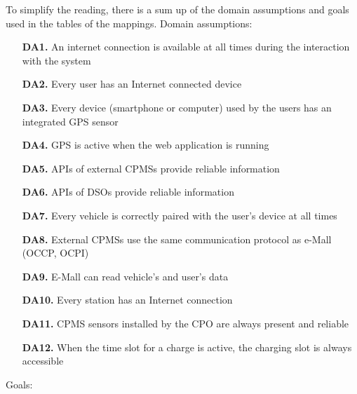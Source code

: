 \documentclass[12pt]{report}
\begin{document}
\noindent To simplify the reading, there is a sum up of the domain assumptions and goals used in the tables of the mappings.
Domain assumptions:
\begin{itemize}
    \item[\textbf{DA1.}]An internet connection is available at all times during the interaction with the system
    \item[\textbf{DA2.}]Every user has an Internet connected device
    \item[\textbf{DA3.}]Every device (smartphone or computer) used by the users has an integrated GPS sensor
    \item[\textbf{DA4.}]GPS is active when the web application is running
    \item[\textbf{DA5.}] APIs of external CPMSs provide reliable information
    \item[\textbf{DA6.}] APIs of DSOs provide reliable information
    \item[\textbf{DA7.}]Every vehicle is correctly paired with the user’s device at all times
    \item[\textbf{DA8.}]External CPMSs use the same communication protocol as e-Mall (OCCP, OCPI)
    \item[\textbf{DA9.}]E-Mall can read vehicle’s and user’s data
    \item[\textbf{DA10.}]Every station has an Internet connection
    \item[\textbf{DA11.}]CPMS sensors installed by the CPO are always 
    present and reliable
    \item[\textbf{DA12.}]When the time slot for a charge is active, the charging slot is always accessible
\end{itemize}
\newpage
\noindent Goals:
\end{document}
